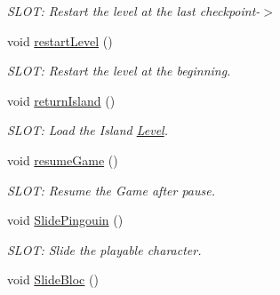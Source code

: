 \begin{DoxyCompactItemize}
\begin{DoxyCompactList}\small\item\em S\+L\+O\+T\+: Restart the level at the last checkpoint-\/$>$ \end{DoxyCompactList}\item 
\hypertarget{class_gameboard_a0d4ac38611d2ed24732823656ba613e0}{}void \hyperlink{class_gameboard_a0d4ac38611d2ed24732823656ba613e0}{restart\+Level} ()\label{class_gameboard_a0d4ac38611d2ed24732823656ba613e0}

\begin{DoxyCompactList}\small\item\em S\+L\+O\+T\+: Restart the level at the beginning. \end{DoxyCompactList}\item 
\hypertarget{class_gameboard_a538d797eadaa51a15c999c14f984f76c}{}void \hyperlink{class_gameboard_a538d797eadaa51a15c999c14f984f76c}{return\+Island} ()\label{class_gameboard_a538d797eadaa51a15c999c14f984f76c}

\begin{DoxyCompactList}\small\item\em S\+L\+O\+T\+: Load the Island \hyperlink{class_level}{Level}. \end{DoxyCompactList}\item 
\hypertarget{class_gameboard_a1447e62dd9f78bcba4bdb06c4bfb8f10}{}void \hyperlink{class_gameboard_a1447e62dd9f78bcba4bdb06c4bfb8f10}{resume\+Game} ()\label{class_gameboard_a1447e62dd9f78bcba4bdb06c4bfb8f10}

\begin{DoxyCompactList}\small\item\em S\+L\+O\+T\+: Resume the Game after pause. \end{DoxyCompactList}\item 
\hypertarget{class_gameboard_ac59525fc331dafd4a1a290593327aa7c}{}void \hyperlink{class_gameboard_ac59525fc331dafd4a1a290593327aa7c}{Slide\+Pingouin} ()\label{class_gameboard_ac59525fc331dafd4a1a290593327aa7c}

\begin{DoxyCompactList}\small\item\em S\+L\+O\+T\+: Slide the playable character. \end{DoxyCompactList}\item 
\hypertarget{class_gameboard_aa4e9c04466f50e1590269eab05773581}{}void \hyperlink{class_gameboard_aa4e9c04466f50e1590269eab05773581}{Slide\+Bloc} ()\label{class_gameboard_aa4e9c04466f50e1590269eab05773581}


\end{DoxyCompactItemize}
